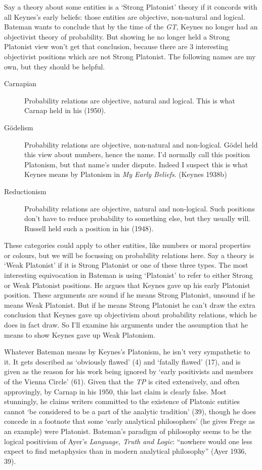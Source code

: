 \documentclass[noflushend]{philosophersimprint}
\begin{document}
Say a theory about some entities is a `Strong Platonist' theory if it
concords with all Keynes's early beliefs: those entities are objective,
non-natural and logical. Bateman wants to conclude that by the time of
the \emph{GT}, Keynes no longer had an objectivist theory of
probability. But showing he no longer held a Strong Platonist view won't
get that conclusion, because there are 3 interesting objectivist
positions which are not Strong Platonist. The following names are my
own, but they should be helpful.

\begin{description}
\item[Carnapian]
Probability relations are objective, natural and logical. This is what
Carnap held in his (1950).
\item[Gödelism]
Probability relations are objective, non-natural and non-logical. Gödel
held this view about numbers, hence the name. I'd normally call this
position Platonism, but that name's under dispute. Indeed I suspect this
is what Keynes means by Platonism in \emph{My Early Beliefs}. (Keynes
1938b)
\item[Reductionism]
Probability relations are objective, natural and non-logical. Such
positions don't have to reduce probability to something else, but they
usually will. Russell held such a position in his (1948).
\end{description}

These categories could apply to other entities, like numbers or moral
properties or colours, but we will be focussing on probability relations
here. Say a theory is `Weak Platonist' if it is Strong Platonist or one
of these three types. The most interesting equivocation in Bateman is
using `Platonist' to refer to either Strong or Weak Platonist positions.
He argues that Keynes gave up his early Platonist position. These
arguments are sound if he means Strong Platonist, unsound if he means
Weak Platonist. But if he means Strong Platonist he can't draw the extra
conclusion that Keynes gave up objectivism about probability relations,
which he does in fact draw. So I'll examine his arguments under the
assumption that he means to show Keynes gave up Weak Platonism.

Whatever Bateman means by Keynes's Platonism, he isn't very sympathetic
to it. It gets described as `obviously flawed' (4) and `fatally flawed'
(17), and is given as the reason for his work being ignored by `early
positivists and members of the Vienna Circle' (61). Given that the
\emph{TP} is cited extensively, and often approvingly, by Carnap in his
1950, this last claim is clearly false. Most stunningly, he claims
writers committed to the existence of Platonic entities cannot `be
considered to be a part of the analytic tradition' (39), though he does
concede in a footnote that some `early analytical philosophers' (he
gives Frege as an example) were Platonist. Bateman's paradigm of
philosophy seems to be the logical positivism of Ayer's \emph{Language,
Truth and Logic}: ``nowhere would one less expect to find metaphysics
than in modern analytical philosophy'' (Ayer 1936, 39).
\end{document}
